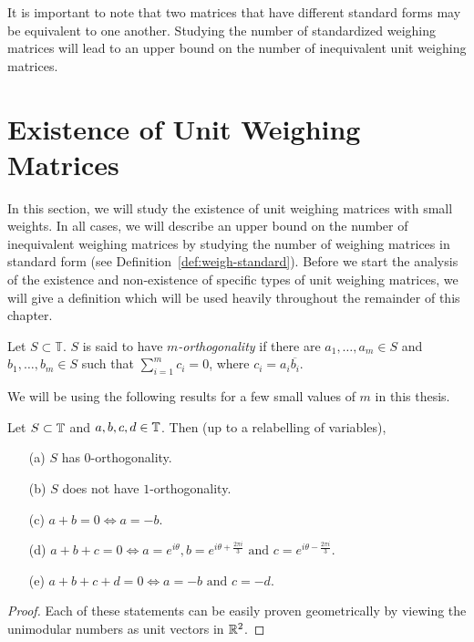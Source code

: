 It is important to note that two matrices that have different standard forms may be equivalent to one another. Studying the number of standardized weighing matrices will lead to an upper bound on the number of inequivalent unit weighing matrices.

\section[Existence of Unit Weighing Matrices]{Existence of Unit Weighing Matrices}
\label{sec:existence-weigh}

In this section, we will study the existence of unit weighing matrices with small weights. In all cases, we will describe an upper bound on the number of inequivalent weighing matrices by studying the number of weighing matrices in standard form (see Definition~\ref{def:weigh-standard}). Before we start the analysis of the existence and non-existence of specific types of unit weighing matrices, we will give a definition which will be used heavily throughout the remainder of this chapter.

\begin{definition} \label{def:m-orth}
 Let $S \subset \mathbb{T}$. $S$ is said to have {\it $m$-orthogonality} if there are $a_1,\dots,a_m \in S$ and $b_1,\dots,b_m \in S$ such that $\sum_{i=1}^m c_i = 0$, where $c_i = a_i\overline{b_i}$.
\end{definition}

We will be using the following results for a few small values of $m$ in this thesis.

\begin{proposition} \label{prop:m-orth}
 Let $S \subset \mathbb{T}$ and $a,b,c,d \in \mathbb{T}$. Then (up to a relabelling of variables),

 \begin{enumerate}
  \item[(a)] $S$ has $0$-orthogonality.
  \item[(b)] $S$ does not have $1$-orthogonality.
  \item[(c)] $a + b = 0 \iff a = -b$.
  \item[(d)] $a + b + c = 0 \iff a = e^{i\theta}, b = e^{i\theta + \frac{2\pi i}{3}} \text{ and } c = e^{i\theta-\frac{2\pi i}{3}}$.
  \item[(e)] $a + b + c + d = 0 \iff a = -b \text{ and } c = -d$.
 \end{enumerate}

 \begin{proof}
  Each of these statements can be easily proven geometrically by viewing the unimodular numbers as unit vectors in $\mathbb{R}^2$.
 \end{proof}
\end{proposition}

